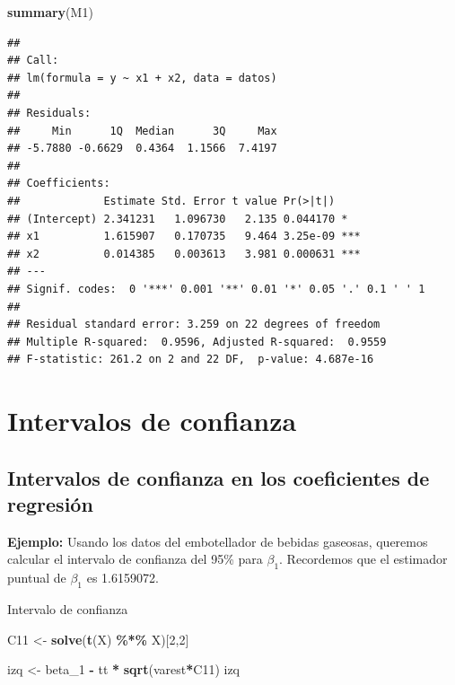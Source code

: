 \documentclass[
]{book}
\newenvironment{Shaded}{\begin{snugshade}}{\end{snugshade}}
\newcommand{\DecValTok}[1]{\textcolor[rgb]{0.00,0.00,0.81}{#1}}
\newcommand{\FunctionTok}[1]{\textcolor[rgb]{0.13,0.29,0.53}{\textbf{#1}}}
\newcommand{\NormalTok}[1]{#1}
\newcommand{\OtherTok}[1]{\textcolor[rgb]{0.56,0.35,0.01}{#1}}
\newcommand{\SpecialCharTok}[1]{\textcolor[rgb]{0.81,0.36,0.00}{\textbf{#1}}}
\begin{document}
\begin{Shaded}
\begin{Highlighting}[]
\FunctionTok{summary}\NormalTok{(M1)}
\end{Highlighting}
\end{Shaded}

\begin{verbatim}
## 
## Call:
## lm(formula = y ~ x1 + x2, data = datos)
## 
## Residuals:
##     Min      1Q  Median      3Q     Max 
## -5.7880 -0.6629  0.4364  1.1566  7.4197 
## 
## Coefficients:
##             Estimate Std. Error t value Pr(>|t|)    
## (Intercept) 2.341231   1.096730   2.135 0.044170 *  
## x1          1.615907   0.170735   9.464 3.25e-09 ***
## x2          0.014385   0.003613   3.981 0.000631 ***
## ---
## Signif. codes:  0 '***' 0.001 '**' 0.01 '*' 0.05 '.' 0.1 ' ' 1
## 
## Residual standard error: 3.259 on 22 degrees of freedom
## Multiple R-squared:  0.9596, Adjusted R-squared:  0.9559 
## F-statistic: 261.2 on 2 and 22 DF,  p-value: 4.687e-16
\end{verbatim}

\section{Intervalos de confianza}\label{intervalos-de-confianza}

\subsection{Intervalos de confianza en los coeficientes de regresión}\label{intervalos-de-confianza-en-los-coeficientes-de-regresiuxf3n}

\textbf{Ejemplo:} Usando los datos del embotellador de bebidas gaseosas, queremos calcular el intervalo de confianza del 95\% para \(\beta_1\). Recordemos que el estimador puntual de \(\beta_1\) es 1.6159072.

Intervalo de confianza

\begin{Shaded}
\begin{Highlighting}[]
\NormalTok{C11 }\OtherTok{\textless{}{-}} \FunctionTok{solve}\NormalTok{(}\FunctionTok{t}\NormalTok{(X) }\SpecialCharTok{\%*\%}\NormalTok{ X)[}\DecValTok{2}\NormalTok{,}\DecValTok{2}\NormalTok{]}

\NormalTok{izq }\OtherTok{\textless{}{-}}\NormalTok{ beta\_1 }\SpecialCharTok{{-}}\NormalTok{ tt }\SpecialCharTok{*} \FunctionTok{sqrt}\NormalTok{(varest}\SpecialCharTok{*}\NormalTok{C11)}
\NormalTok{izq}
\end{Highlighting}
\end{Shaded}
\end{document}
